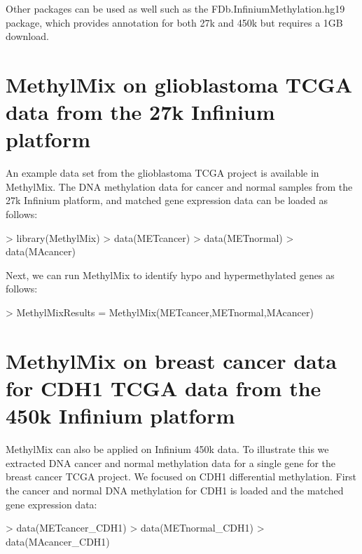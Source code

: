 \documentclass[11pt]{article}
\begin{document}
Other packages can be used as well such as the FDb.InfiniumMethylation.hg19 
package, which provides annotation for both 27k and 450k but requires a 1GB 
download. \\

\section{MethylMix on glioblastoma TCGA data from the 27k Infinium platform}

An example data set from the glioblastoma TCGA project is available in 
MethylMix. The DNA methylation data for cancer and normal samples from the 27k 
Infinium platform, and matched gene expression data can be loaded as follows: 

\begin{Schunk}
\begin{Sinput}
> library(MethylMix)
> data(METcancer)
> data(METnormal)
> data(MAcancer)
\end{Sinput}
\end{Schunk}

Next, we can run MethylMix to identify hypo and hypermethylated genes as 
follows:

\begin{Schunk}
\begin{Sinput}
> MethylMixResults = MethylMix(METcancer,METnormal,MAcancer)
\end{Sinput}
\end{Schunk}



\section{MethylMix on breast cancer data for CDH1 TCGA data from the 450k 
Infinium platform}

MethylMix can also be applied on Infinium 450k data. To illustrate this we 
extracted DNA cancer and normal methylation data for a single gene for the 
breast cancer TCGA project. We focused on CDH1 differential methylation. 
First the cancer and normal DNA methylation for CDH1 is loaded and the matched 
gene expression data: 

\begin{Schunk}
\begin{Sinput}
> data(METcancer_CDH1)
> data(METnormal_CDH1)
> data(MAcancer_CDH1)
\end{Sinput}
\end{Schunk}
\end{document}
